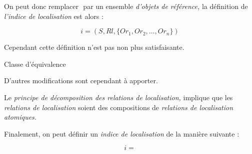 On peut donc remplacer \(\) par un ensemble \emph{d'objets de
  référence,} la définition de \emph{l'indice de localisation} est
alors :

\begin{equation}
  i = (S, Rl, \{Or_1, Or_2, \ldots, Or_n\})
\end{equation}

Cependant cette définition n'est pas non plus satisfaisante.

Classe d'équivalence


D'autres modifications sont cependant à apporter.

Le \emph{principe de décomposition des relations de localisation,}
implique que les \emph{relations de localisation} soient des
compositions de \emph{relations de localisation atomiques.}



Finalement, on peut définir un \emph{indice de localisation} de la
manière suivante :

\begin{equation}
  i =
\end{equation}

